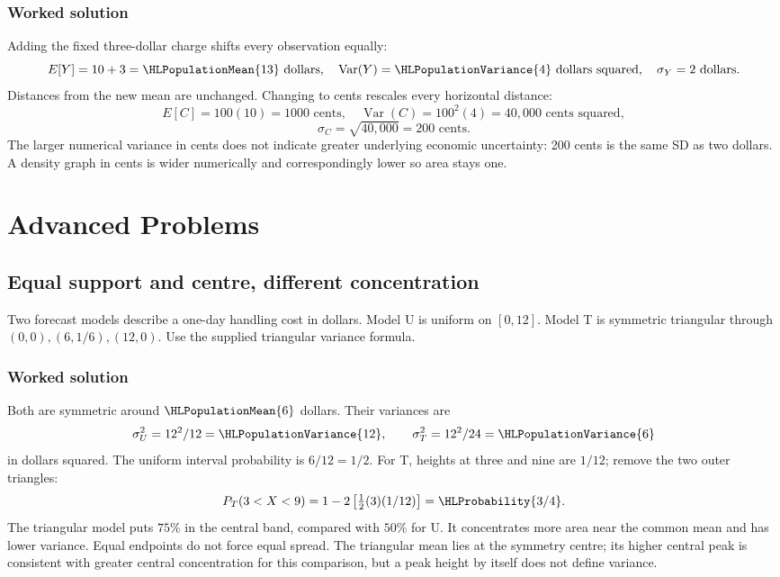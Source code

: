 \subsubsection*{Worked solution}\label{sol:sec:general-worked2}
Adding the fixed three-dollar charge shifts every observation equally:
\[
E[Y]=10+3=\HLPopulationMean{13}\text{ dollars},\quad
\operatorname{Var}(Y)=\HLPopulationVariance{4}\text{ dollars squared},\quad
\sigma_Y=2\text{ dollars}.
\]
Distances from the new mean are unchanged. Changing to cents rescales every horizontal distance:
\[
E[C]=100(10)=1000\text{ cents},\quad
\operatorname{Var}(C)=100^2(4)=40{,}000\text{ cents squared},
\]
\[
\sigma_C=\sqrt{40{,}000}=200\text{ cents}.
\]
The larger numerical variance in cents does not indicate greater underlying economic uncertainty: 200 cents is the same SD as two dollars. A density graph in cents is wider numerically and correspondingly lower so area stays one.
\section{Advanced Problems}\label{sec:advanced}

\subsection{Equal support and centre, different concentration}\label{prob:sec:advanced0}
Two forecast models describe a one-day handling cost in dollars. Model U is uniform on $[0,12]$. Model T is symmetric triangular through $(0,0),(6,1/6),(12,0)$. Use the supplied triangular variance formula.
\subsubsection*{Worked solution}\label{sol:sec:advanced0}
Both are symmetric around $\HLPopulationMean{6}$ dollars. Their variances are
\[
\sigma_U^2=12^2/12=\HLPopulationVariance{12},\qquad
\sigma_T^2=12^2/24=\HLPopulationVariance{6}
\]
in dollars squared. The uniform interval probability is $6/12=1/2$. For T, heights at three and nine are $1/12$; remove the two outer triangles:
\[
P_T(3<X<9)=1-2\left[\tfrac12(3)(1/12)\right]=\HLProbability{3/4}.
\]
The triangular model puts $75\%$ in the central band, compared with $50\%$ for U. It concentrates more area near the common mean and has lower variance. Equal endpoints do not force equal spread.
The triangular mean lies at the symmetry centre; its higher central peak is consistent with greater central concentration for this comparison, but a peak height by itself does not define variance.



